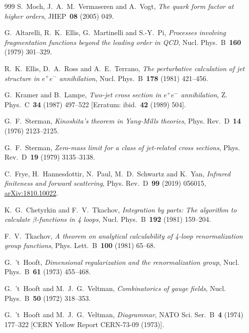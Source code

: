 \begin{thebibliography}{999}
S.~Moch, J.~A.~M.~Vermaseren and A.~Vogt, \emph{The quark form factor at higher orders}, JHEP~\textbf{08} (2005) \mbox{049}.

G.~Altarelli, R.~K.~Ellis, G.~Martinelli and S.-Y.~Pi, \emph{Processes involving fragmentation functions beyond the leading order in QCD}, Nucl. Phys.~B~\textbf{160} (1979) \mbox{301--329}.

R.~K.~Ellis, D.~A.~Ross and A.~E.~Terrano, \emph{The perturbative calculation of jet structure in $e^+e^-$ annihilation}, Nucl. Phys.~B~\textbf{178} (1981) \mbox{421--456}.

G.~Kramer and B.~Lampe, \emph{Two-jet cross section in $e^+e^-$ annihilation}, Z. Phys.~C~\textbf{34} (1987) \mbox{497--522} [Erratum: ibid.~\textbf{42} (1989) \mbox{504}].

G.~F.~Sterman, \emph{Kinoshita's theorem in Yang-Mills theories}, Phys. Rev.~D~\textbf{14} (1976) \mbox{2123--2125}.

G.~F.~Sterman, \emph{Zero-mass limit for a class of jet-related cross sections}, Phys. Rev.~D~\textbf{19} (1979) \mbox{3135--3138}.

C.~Frye, H.~Hannesdottir, N.~Paul, M.~D.~Schwartz and K.~Yan, \emph{Infrared finiteness and forward scattering}, Phys. Rev.~D~\textbf{99} (2019) \mbox{056015}, \href{https://arxiv.org/abs/1810.10022}{arXiv:1810.10022}.

K.~G.~Chetyrkin and F.~V.~Tkachov, \emph{Integration by parts: The algorithm to calculate $\beta$-functions in 4 loops}, Nucl. Phys.~B~\textbf{192} (1981) \mbox{159--204}.

F.~V.~Tkachov, \emph{A theorem on analytical calculability of 4-loop renormalization group functions}, Phys. Lett.~B~\textbf{100} (1981) \mbox{65--68}.

G.~'t~Hooft, \emph{Dimensional regularization and the renormalization group}, Nucl. Phys.~B~\textbf{61} (1973) \mbox{455--468}.

G.~'t~Hooft and M.~J.~G.~Veltman, \emph{Combinatorics of gauge fields}, Nucl. Phys.~B~\textbf{50} (1972) \mbox{318--353}.

G.~'t~Hooft and M.~J.~G.~Veltman, \emph{Diagrammar}, NATO Sci. Ser.~B~\textbf{4} (1974) \mbox{177--322} [CERN Yellow Report CERN-73-09 (1973)].


\end{thebibliography}
